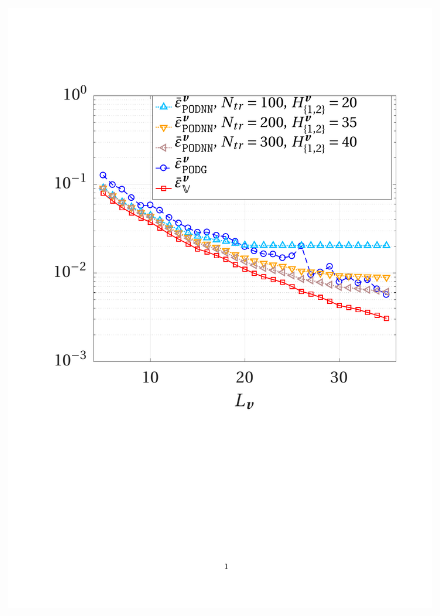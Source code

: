 \documentclass{elsarticle}
\numberwithin{equation}{section}
\theoremstyle{theorem}
\theoremstyle{definition}
\theoremstyle{remark}
\theoremstyle{proposition}
\numberwithin{figure}{section}
\begin{document}
\begin{figure}[t!]
			\includegraphics[scale = 0.38, trim = {2cm 9cm 1.5cm 3.5cm}, clip]{dc_400_vel_error_vs_rank_ter}
			\hspace*{1cm}

\end{figure}
\end{document}
